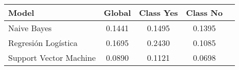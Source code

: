 \begin{tabular}{p{3cm}|c|c|c|c}
\toprule
                  Model &  Global &  Class Yes &  Class No \\
\midrule
            Naive Bayes &  0.1441 &     0.1495 &    0.1395 \\
    Regresión Logística &  0.1695 &     0.2430 &    0.1085 \\
 Support Vector Machine &  0.0890 &     0.1121 &    0.0698 \\
\bottomrule
\end{tabular}

